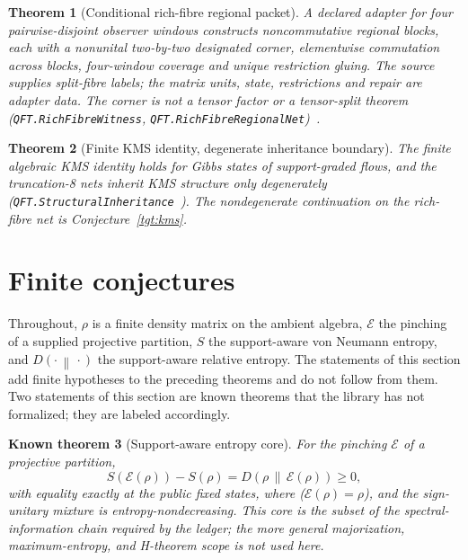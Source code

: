 \documentclass[11pt]{article}
\newtheorem{theorem}{Theorem}[section]
\newtheorem{known}[theorem]{Known theorem}
\theoremstyle{remark}
\newcommand{\KL}[2]{D\!\left(#1\,\middle\|\,#2\right)}
\newcommand{\Ent}{S}
\begin{document}
\begin{theorem}[Conditional rich-fibre regional packet]
A declared adapter for four pairwise-disjoint observer windows constructs
noncommutative regional blocks, each with a nonunital two-by-two designated
corner, elementwise commutation across blocks, four-window coverage and
unique restriction gluing. The source supplies split-fibre labels; the
matrix units, state, restrictions and repair are adapter data. The corner
is not a tensor factor or a tensor-split theorem
(\texttt{QFT.RichFibreWitness}, \texttt{QFT.RichFibreRegionalNet})~\cite{ophlean}.
\end{theorem}

\begin{theorem}[Finite KMS identity, degenerate inheritance boundary]
The finite algebraic KMS identity holds for Gibbs states of
support-graded flows, and the truncation-8 nets inherit KMS
structure only degenerately
(\texttt{QFT.StructuralInheritance}~\cite{ophlean}).
The nondegenerate continuation on the rich-fibre net is
Conjecture~\ref{tgt:kms}.
\end{theorem}

\section{Finite conjectures}
\label{sec:targets}

Throughout, $\rho$ is a finite density matrix on the ambient algebra,
$\mathcal E$ the pinching of a supplied projective partition, $\Ent$ the
support-aware von Neumann entropy, and $\KL{\cdot}{\cdot}$ the
support-aware relative entropy. The statements of this section add finite
hypotheses to the preceding theorems and do not follow from them. Two statements of this section are known theorems that the
library has not formalized; they are labeled accordingly.

\begin{known}[Support-aware entropy core]
\label{tgt:core}
For the pinching $\mathcal E$ of a projective partition,
\[
  \Ent(\mathcal E(\rho))-\Ent(\rho)=\KL{\rho}{\mathcal E(\rho)}\ge 0 ,
\]
with equality exactly at the public fixed states, where
($\mathcal E(\rho)=\rho$), and the sign-unitary mixture is
entropy-nondecreasing. This core is the subset of the
spectral-information chain required by the ledger; the more general
majorization, maximum-entropy, and H-theorem scope is not used here.
\end{known}
\end{document}
